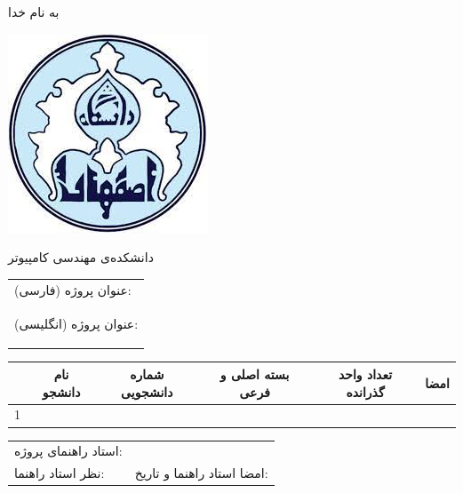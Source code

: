 \documentclass{article}
\begin{document}
\begin{center}
{\small به نام خدا}

\vspace{5mm}
\includegraphics[scale=0.3]{images/logo}

{\small دانشکده‌ی مهندسی کامپیوتر}
\vspace{5mm}

\begin{adjustbox}{width=\textwidth}
\begin{tabular}{|p{\textwidth}|}
\hline
عنوان پروژه (فارسی):‌
\\
عنوان پروژه (انگلیسی):
\begin{latin}
\end{latin}
\\ \hline
\end{tabular}
\end{adjustbox}

\vspace{2mm}

\begin{adjustbox}{width=\textwidth}
\begin{tabular}{|c|c|c|c|c|p{2cm}|}
\cline{2-6}
\multicolumn{1}{c|}{} &

نام دانشجو & 
شماره‌ دانشجویی &
بسته اصلی و فرعی &
تعداد واحد گذرانده &
امضا \\
\hline
1 &
&
&
&
&
\\
\hline
\end{tabular}
\end{adjustbox}

\vspace{2mm}

\begin{adjustbox}{width=\textwidth}
\begin{tabular}{|p{}|p{}|}
\hline
استاد راهنمای پروژه: %
&
\\
\cline{1-1}
نظر استاد راهنما:  %
\vspace{4cm}
& 
\vspace{3.6cm}
امضا استاد راهنما و تاریخ: %
\\
\hline
\end{tabular}
\end{adjustbox}


\end{center}
\end{document}
